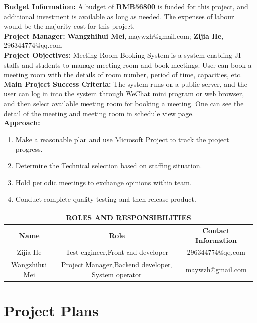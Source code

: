 \documentclass[runningheads]{llncs}
\begin{document}
\noindent
\textbf{Budget Information:} A budget of \textbf{RMB56800} is funded for this project, and additional investment is available as long as needed. The expenses of labour would be the majority cost for this project.\\
\textbf{Project Manager:} \textbf{Wangzhihui Mei}, maywzh@gmail.com; \textbf{Zijia He}, 296344774@qq.com\\
\textbf{Project Objectives:} Meeting Room Booking System is a system enabling JI staffs and students to manage meeting room and book meetings. User can book a meeting room with the details of room number, period of time, capacities, etc. \\
\textbf{Main Project Success Criteria:} The system runs on a public server, and the user can log in into the system through WeChat mini program or web browser, and then select available meeting room for booking a meeting. One can see the detail of the meeting and meeting room in schedule view page. \\
\textbf{Approach:}
\begin{enumerate}
  \item Make a reasonable plan and use Microsoft Project to track the project progress. 
  \item Determine the Technical selection based on staffing situation.
  \item Hold periodic meetings to exchange opinions within team.
  \item Conduct complete quality testing and then release product.
\end{enumerate}

\begin{table}
\centering
  \begin{tabular}{|c|c|c|}
  \hline
  \multicolumn{3}{|c|}{\textbf{ROLES AND RESPONSIBILITIES}}\\ %
  \hline
  \textbf{Name}&\textbf{Role}&\textbf{Contact Information}\\
  \hline
  Zijia He&Test engineer,Front-end developer& 296344774@qq.com\\
  \hline
  Wangzhihui Mei&Project Manager,Backend developer, System operator&maywzh@gmail.com\\
  \hline
  \end{tabular}
\end{table}



\section{Project Plans}
\end{document}
